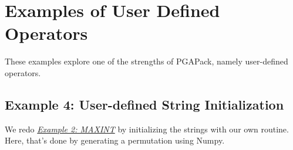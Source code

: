 \documentclass[letterpaper,11pt,english]{sphinxmanual}
\begin{document}
\section{Examples of User Defined Operators}
\label{examples:sec-useroperatorexamples}\label{examples:examples-of-user-defined-operators}
These examples explore one of the strengths of PGAPack,
namely user-defined operators.


\subsection{Example 4: User-defined String Initialization}
\label{examples:example-4-user-defined-string-initialization}\label{examples:sec-initstringexamples}
We redo {\hyperref[examples:sec-maxintexample]{\emph{Example 2: MAXINT}}} by initializing the strings
with our own routine.  Here, that's done by generating a
permutation using Numpy.
\end{document}
